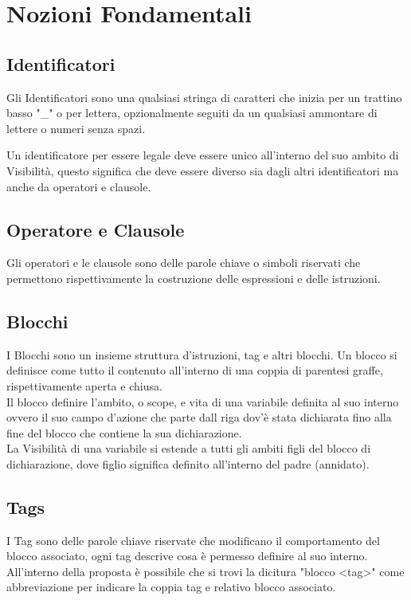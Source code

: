 \section{Nozioni Fondamentali}

\subsection{Identificatori}
Gli Identificatori sono una qualsiasi stringa di caratteri che inizia per un trattino basso "\_" o 
per lettera, opzionalmente seguiti da un qualsiasi ammontare di lettere o numeri senza spazi.

Un identificatore per essere legale deve essere unico all'interno del suo ambito di Visibilità,
questo significa che deve essere diverso sia dagli altri identificatori ma anche da operatori e clausole.  

\subsection{Operatore e Clausole}
Gli operatori e le clausole sono delle parole chiave o simboli riservati che permettono rispettivamente
la costruzione delle espressioni e delle istruzioni.

\subsection{Blocchi}
I Blocchi sono un insieme struttura d'istruzioni, tag e altri blocchi.
Un blocco si definisce come tutto il contenuto all'interno di una coppia di parentesi graffe,
rispettivamente aperta e chiusa. 
\\
Il blocco definire l'ambito, o scope, e vita di una variabile definita al suo interno ovvero
il suo campo d'azione che parte dall riga dov'è stata dichiarata fino alla fine del blocco 
che contiene la sua dichiarazione.
\\
La Visibilità di una variabile si estende a tutti gli ambiti figli del blocco di dichiarazione, 
dove figlio significa definito all'interno del padre (annidato).

 
\subsection{Tags}
I Tag sono delle parole chiave riservate che modificano il comportamento del blocco associato, 
ogni tag descrive cosa è permesso definire al suo interno.
All'interno della proposta è possibile che si trovi la dicitura "blocco <tag>" come abbreviazione
per indicare la coppia tag e relativo blocco associato.

